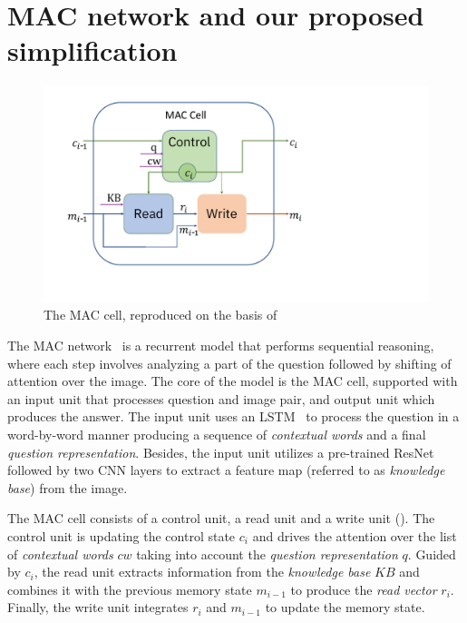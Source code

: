 \section{MAC network and our proposed simplification}

\begin{figure}
	\vspace{-15pt}
	\centering
	\includegraphics[width=\textwidth]{img/mac_cell.pdf}
	\caption{The MAC cell, reproduced on the basis of~\cite{hudson2018compositional}}
	\label{fig:mac_cell}
	\vspace{-5pt}
\end{figure}

The MAC network~\cite{hudson2018compositional} is a recurrent model that performs sequential reasoning, where each step involves analyzing a part of the question followed by shifting of attention over the image.
The core of the model is the MAC cell, supported with an input unit that processes question and image pair, and output unit which produces the answer.%
The input unit  uses an LSTM~\cite{hochreiter1997long} to process the question in a word-by-word manner producing a sequence of \emph{contextual words} and a final \emph{question representation}.
Besides, the input unit utilizes a pre-trained ResNet~\cite{he2016resnet} followed by two CNN layers to extract a feature map (referred to as \emph{knowledge base}) from the image.

	
The MAC cell consists of a control unit, a read unit and a write unit ().
The control unit is updating the control state $c_i$ and drives the attention over the list of \emph{contextual words} $cw$ taking into account the \emph{question representation} $q$.
Guided by $c_i$,  the read unit extracts information from the \emph{knowledge base} $KB$ and combines it with the previous memory state $m_{i-1}$  to produce the \emph{read vector} $r_i$.
Finally, the write unit integrates $r_i$ and $m_{i-1}$ to update the memory state.

